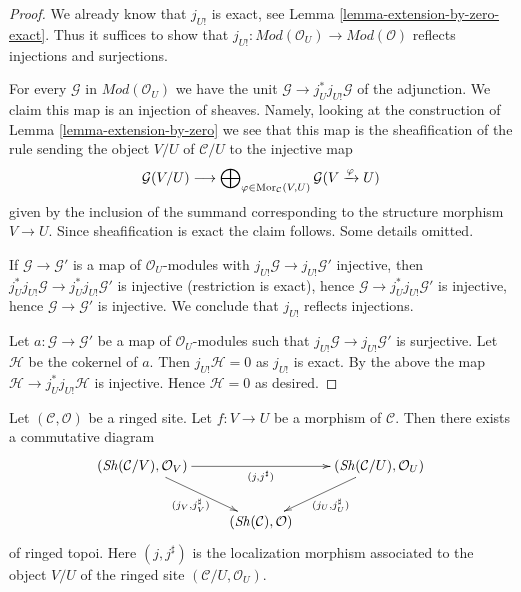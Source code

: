 \begin{proof}
We already know that $j_{U!}$ is exact, see
Lemma \ref{lemma-extension-by-zero-exact}.
Thus it suffices to show that
$j_{U!} :  \textit{Mod}(\mathcal{O}_U) \to \textit{Mod}(\mathcal{O})$
reflects injections and surjections.

\medskip\noindent
For every $\mathcal{G}$ in $\textit{Mod}(\mathcal{O}_U)$
we have the unit $\mathcal{G} \to j_U^*j_{U!}\mathcal{G}$
of the adjunction. We claim this map is an injection of sheaves.
Namely, looking at the construction of Lemma \ref{lemma-extension-by-zero}
we see that this map is the sheafification of the rule sending the object
$V/U$ of $\mathcal{C}/U$ to the injective map
$$
\mathcal{G}(V/U) \longrightarrow
\bigoplus\nolimits_{\varphi \in \mathop{\mathrm{Mor}}\nolimits_\mathcal{C}(V, U)}
\mathcal{G}(V \xrightarrow{\varphi} U)
$$
given by the inclusion of the summand corresponding to the structure
morphism $V \to U$. Since sheafification is exact the claim follows.
Some details omitted.

\medskip\noindent
If $\mathcal{G} \to \mathcal{G}'$ is a map of $\mathcal{O}_U$-modules with
$j_{U!}\mathcal{G} \to j_{U!}\mathcal{G}'$ injective,
then $j_U^*j_{U!}\mathcal{G} \to j_U^*j_{U!}\mathcal{G}'$ is injective
(restriction is exact), hence
$\mathcal{G} \to j_U^*j_{U!}\mathcal{G}'$ is injective, hence
$\mathcal{G} \to \mathcal{G}'$ is injective.
We conclude that $j_{U!}$ reflects injections.

\medskip\noindent
Let $a : \mathcal{G} \to \mathcal{G}'$ be a map of $\mathcal{O}_U$-modules
such that $j_{U!}\mathcal{G} \to j_{U!}\mathcal{G}'$ is surjective.
Let $\mathcal{H}$ be the cokernel of $a$.
Then $j_{U!}\mathcal{H} = 0$ as $j_{U!}$ is exact.
By the above the map $\mathcal{H} \to j^*_U j_{U!}\mathcal{H}$
is injective. Hence $\mathcal{H} = 0$ as desired.
\end{proof}

\begin{lemma}
\label{lemma-relocalize}
Let $(\mathcal{C}, \mathcal{O})$ be a ringed site.
Let $f : V \to U$ be a morphism of $\mathcal{C}$.
Then there exists a commutative diagram
$$
\xymatrix{
(\Sh(\mathcal{C}/V), \mathcal{O}_V)
\ar[rd]_{(j_V, j_V^\sharp)} \ar[rr]_{(j, j^\sharp)} & &
(\Sh(\mathcal{C}/U), \mathcal{O}_U)
\ar[ld]^{(j_U, j_U^\sharp)} \\
& (\Sh(\mathcal{C}), \mathcal{O}) &
}
$$
of ringed topoi. Here $(j, j^\sharp)$ is the localization morphism
associated to the object $V/U$ of the ringed site
$(\mathcal{C}/U, \mathcal{O}_U)$.
\end{lemma}

